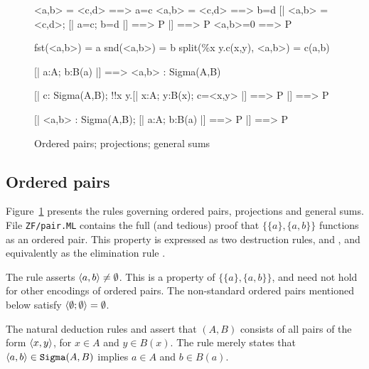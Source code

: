 \begin{figure}
\begin{ttbox}
    <a,b> = <c,d> ==> a=c
    <a,b> = <c,d> ==> b=d
     [| <a,b> = <c,d>;  [| a=c; b=d |] ==> P |] ==> P
      <a,b>=0 ==> P

        fst(<a,b>) = a
        snd(<a,b>) = b
           split(\%x y.c(x,y), <a,b>) = c(a,b)

          [| a:A;  b:B(a) |] ==> <a,b> : Sigma(A,B)

          [| c: Sigma(A,B);  
                   !!x y.[| x:A; y:B(x); c=<x,y> |] ==> P |] ==> P

         [| <a,b> : Sigma(A,B);    
                   [| a:A;  b:B(a) |] ==> P   |] ==> P
\end{ttbox}
\caption{Ordered pairs; projections; general sums} \label{zf-pair}
\end{figure}


\subsection{Ordered pairs}
Figure~\ref{zf-pair} presents the rules governing ordered pairs,
projections and general sums.  File {\tt ZF/pair.ML} contains the
full (and tedious) proof that $\{\{a\},\{a,b\}\}$ functions as an ordered
pair.  This property is expressed as two destruction rules,
 and , and equivalently
as the elimination rule .

The rule  asserts $\langle a,b\rangle\neq\emptyset$.  This
is a property of $\{\{a\},\{a,b\}\}$, and need not hold for other 
encodings of ordered pairs.  The non-standard ordered pairs mentioned below
satisfy $\langle\emptyset;\emptyset\rangle=\emptyset$.

The natural deduction rules  and 
assert that $(A,B)$ consists of all pairs of the form
$\langle x,y\rangle$, for $x\in A$ and $y\in B(x)$.  The rule 
merely states that $\langle a,b\rangle\in {\tt Sigma}(A,B)$ implies $a\in A$ and
$b\in B(a)$.

